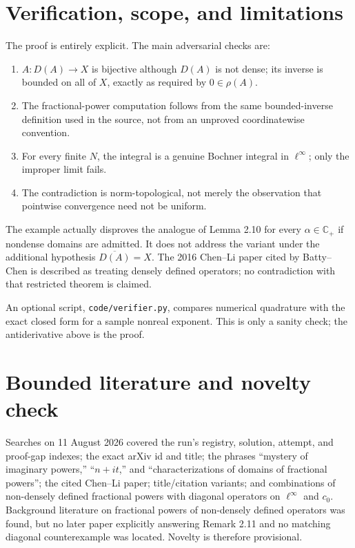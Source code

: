 \documentclass[11pt]{article}
\newcommand{\C}{\mathbb C}
\newcommand{\Lin}{\ell^\infty}
\begin{document}
\section{Verification, scope, and limitations}

The proof is entirely explicit.  The main adversarial checks are:
\begin{enumerate}[leftmargin=*,itemsep=2pt]
\item $A:D(A)\to X$ is bijective although $D(A)$ is not dense; its inverse is
bounded on all of $X$, exactly as required by $0\in\rho(A)$.
\item The fractional-power computation follows from the same bounded-inverse
definition used in the source, not from an unproved coordinatewise convention.
\item For every finite $N$, the integral is a genuine Bochner integral in
$\Lin$; only the improper limit fails.
\item The contradiction is norm-topological, not merely the observation that
pointwise convergence need not be uniform.
\end{enumerate}

The example actually disproves the analogue of Lemma 2.10 for every
$\alpha\in\C_+$ if nondense domains are admitted.  It does not address the
variant under the additional hypothesis $\overline{D(A)}=X$.  The 2016
Chen--Li paper cited by Batty--Chen is described as treating densely defined
operators; no contradiction with that restricted theorem is claimed.

An optional script, \texttt{code/verifier.py}, compares numerical quadrature
with the exact closed form for a sample nonreal exponent.  This is only a
sanity check; the antiderivative above is the proof.

\section{Bounded literature and novelty check}

Searches on 11 August 2026 covered the run's registry, solution, attempt, and
proof-gap indexes; the exact arXiv id and title; the phrases ``mystery of
imaginary powers,'' ``$n+it$,'' and ``characterizations of domains of
fractional powers''; the cited Chen--Li paper; title/citation variants; and
combinations of non-densely defined fractional powers with diagonal operators
on $\Lin$ and $c_0$.  Background literature on fractional powers of
non-densely defined operators was found, but no later paper explicitly
answering Remark 2.11 and no matching diagonal counterexample was located.
Novelty is therefore provisional.
\end{document}

